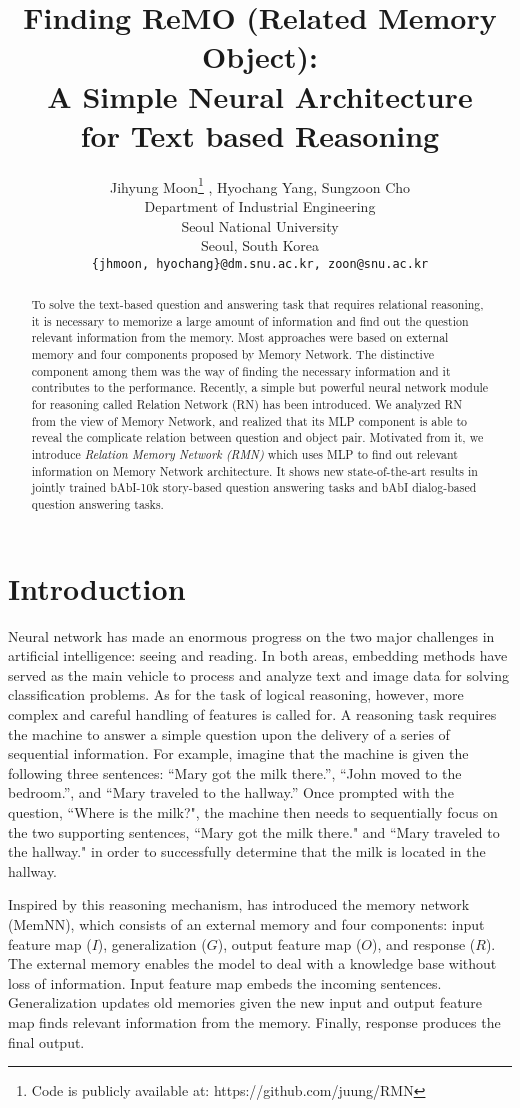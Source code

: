 \documentclass{article} \usepackage{iclr2018_conference,times}
\title{Finding ReMO (Related Memory Object): \\
A Simple Neural Architecture \\ for Text based Reasoning}
\author{Jihyung Moon\thanks{Code is publicly available at: https://github.com/juung/RMN} , Hyochang Yang, Sungzoon Cho \\
Department of Industrial Engineering\\
Seoul National University\\
Seoul, South Korea\\
\texttt{\{jhmoon, hyochang\}@dm.snu.ac.kr, zoon@snu.ac.kr}}
\begin{document}
\maketitle

\begin{abstract}
To solve the text-based question and answering task that requires relational reasoning, it is necessary to memorize a large amount of information and find out the question relevant information from the memory.
Most approaches were based on external memory and four components proposed by Memory Network.
The distinctive component among them was the way of finding the necessary information and it contributes to the performance.
Recently, a simple but powerful neural network module for reasoning called Relation Network (RN) has been introduced. 
We analyzed RN from the view of Memory Network, and realized that its MLP component is able to reveal the complicate relation between question and object pair.
Motivated from it, we introduce \textit{Relation Memory Network (RMN)} which uses MLP to find out relevant information on Memory Network architecture.
It shows new state-of-the-art results in jointly trained bAbI-10k story-based question answering tasks and bAbI dialog-based question answering tasks.
\end{abstract}

\section{Introduction}

Neural network has made an enormous progress on the two major challenges in artificial intelligence: seeing and reading.
In both areas, embedding methods have served as the main vehicle to process and analyze text and image data for solving classification problems. As for the task of logical reasoning, however, more complex and careful handling of features is called for.
A reasoning task requires the machine to answer a simple question upon the delivery of a series of sequential information. For example, imagine that the machine is given the following three sentences: ``Mary got the milk there.'',  ``John moved to the bedroom.'', and ``Mary traveled to the hallway.'' 
Once prompted with the question, ``Where is the milk?", the machine then needs to sequentially focus on the two supporting sentences, ``Mary got the milk there." and ``Mary traveled to the hallway." in order to successfully determine that the milk is located in the hallway.

Inspired by this reasoning mechanism, \citet{Weston15} has introduced the memory network (MemNN), which consists of an external memory and four components: input feature map ($I$), generalization ($G$), output feature map ($O$), and response ($R$).
The external memory enables the model to deal with a knowledge base without loss of information. 
Input feature map embeds the incoming sentences. Generalization updates old memories given the new input and output feature map finds relevant information from the memory. Finally, response produces the final output.
\end{document}

